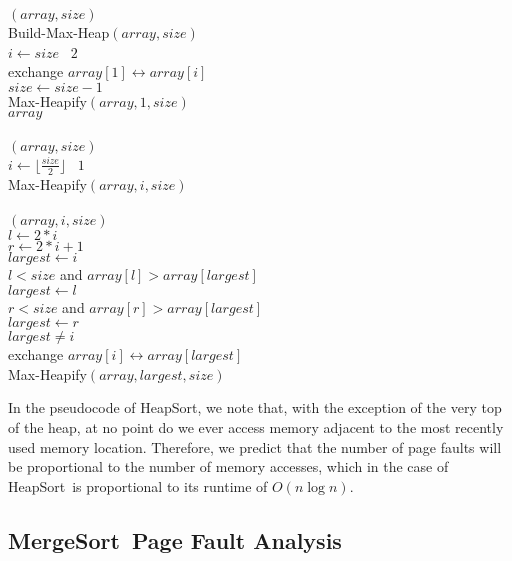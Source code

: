 \documentclass{acmtrans2m}
\newcommand{\heapsort}{{\sc HeapSort}}
\newcommand{\mergesort}{{\sc MergeSort}}
\begin{document}
\begin{narrowfig}{1.5in}
\begin{algorithm}
$(array, size)$\+\\
    Build-Max-Heap$(array, size)$\\
    \For $i \gets size$ \DownTo\ $2$\+\\
        exchange $array[1] \leftrightarrow array[i]$\\
        $size \gets size - 1$\\
        Max-Heapify$(array, 1, size)$\-\\
    \Return $array$\-\\
\\
$(array, size)$\+\\
    \For $i \gets \lfloor \frac{size}{2} \rfloor$ \DownTo\ $1$\+\\
        Max-Heapify$(array, i, size)$\-\-\\
\\
$(array, i, size)$\+\\
    $l \gets 2*i$\\
    $r \gets 2*i + 1$\\
    $largest \gets i$\\
    \If $l < size$ and $array[l] > array[largest]$\+\\
            $largest \gets l$\-\\
    \If $r < size$ and $array[r] > array[largest]$\+\\
            $largest \gets r$\-\\
    \If $largest \neq i$\+\\
        exchange $array[i] \leftrightarrow array[largest]$\\
        Max-Heapify$(array, largest, size)$
\end{algorithm}

\caption{\heapsort\ pseudo code.}
\label{fig:hsort}
\end{narrowfig}

In the pseudocode of \heapsort, we note that, with the exception of the very
top of the heap, at no point do we ever access memory adjacent to the most
recently used memory location.  Therefore, we predict that the number of page
faults will be proportional to the number of memory accesses, which in the case
of \heapsort\ is proportional to its runtime of $O(n \log n)$.

\subsection{\mergesort\ Page Fault Analysis} 
\end{document}
